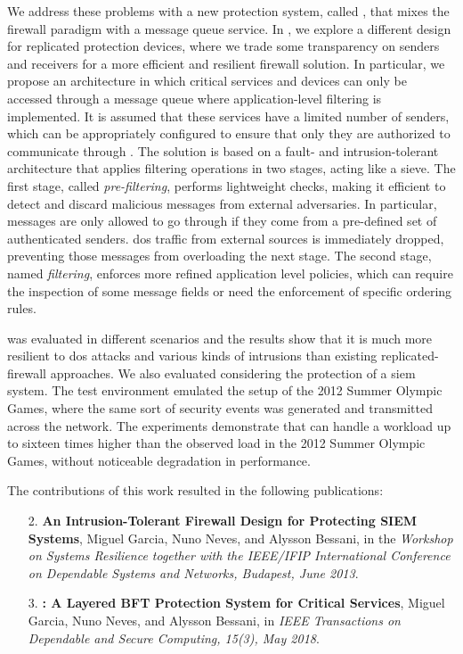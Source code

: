 We address these problems with a new protection system, called \sieveq, that mixes the firewall paradigm with a message queue service.
In \sieveq, we explore a different design for replicated protection devices, where we trade some transparency on senders and receivers for a more efficient and resilient firewall solution.
In particular, we propose an architecture in which critical services and devices can only be accessed through a message queue where application-level filtering is implemented.
It is assumed that these services have a limited number of senders, which can be appropriately configured to ensure that only they are authorized to communicate through \sieveq.
The solution is based on a fault- and intrusion-tolerant architecture that applies filtering operations in two stages, acting like a sieve.
The first stage, called \emph{pre-filtering}, performs lightweight checks, making it efficient to detect and discard malicious messages from external adversaries.
In particular, messages are only allowed to go through if they come from a pre-defined set of authenticated senders.
\gls{dos} traffic from external sources is immediately dropped, preventing those messages from overloading the next stage.
The second stage, named \emph{filtering}, enforces more refined application level policies, which can require the inspection of some message fields or need the enforcement of specific ordering rules.


\sieveq was evaluated in different scenarios and the results show that it is much more resilient to \gls{dos} attacks and various kinds of intrusions than existing replicated-firewall approaches.
We also evaluated \sieveq considering the protection of a \gls{siem} system.
The test environment emulated the setup of the 2012 Summer Olympic Games, where the same sort of security events was generated and transmitted across the network. 
The experiments demonstrate that \sieveq can handle a workload up to sixteen times higher than the observed load in the 2012 Summer Olympic Games, without noticeable degradation in performance.


The contributions of this work resulted in the following publications:

\begin{enumerate}

\item[2.] \textbf{An Intrusion-Tolerant Firewall Design for Protecting SIEM Systems}, Miguel Garcia, Nuno Neves, and Alysson Bessani, in the \emph{Workshop on Systems Resilience together with the {IEEE/IFIP} International Conference on Dependable Systems and Networks,  Budapest, June 2013}.

\item[3.] \textbf{\sieveq: A Layered BFT Protection System for Critical Services}, Miguel Garcia, Nuno Neves, and Alysson Bessani, in \emph{IEEE Transactions on Dependable and Secure Computing, 15(3), May 2018}.



\end{enumerate}



